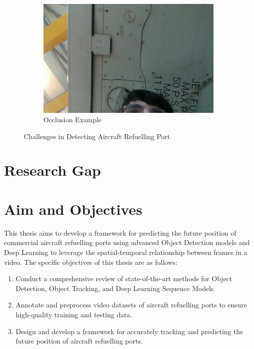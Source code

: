 \documentclass[12pt,oneside]{book} %
\begin{document}
\begin{figure}[H]
\begin{subfigure}[b]{0.45\textwidth}
        \includegraphics[width=\textwidth]{figures/image_hard_4.jpg}
        \caption{Occlusion Example}\label{fig:occlusion-example}
    \end{subfigure}
    \caption{Challenges in Detecting Aircraft Refuelling Port}\label{fig:challenges-detecting-ports}
\end{figure}

\section{Research Gap}

\section{Aim and Objectives}
This thesis aims to develop a framework for predicting the future position of
commercial aircraft refuelling ports using advanced Object Detection models and
Deep Learning to leverage the spatial-temporal relationship between frames in a
video. The specific objectives of this thesis are as follows:
\begin{enumerate}
    \item Conduct a comprehensive review of state-of-the-art methods for Object
          Detection, Object Tracking, and Deep Learning Sequence Models.
    \item Annotate and preprocess video datasets of aircraft refuelling ports to ensure
          high-quality training and testing data.
    \item Design and develop a framework for accurately tracking and predicting the
          future position of aircraft refuelling ports.
\end{enumerate}
\end{document}

